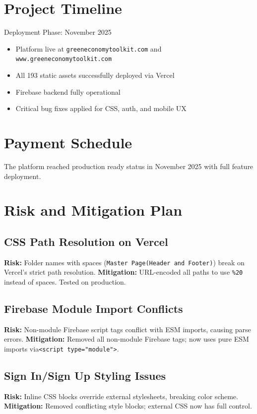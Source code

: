 \documentclass[a4paper,12pt]{article}
\begin{document}
\section{Project Timeline}
Deployment Phase: November 2025
\begin{itemize}
    \item Platform live at \texttt{greeneconomytoolkit.com} and \texttt{www.greeneconomytoolkit.com}
    \item All 193 static assets successfully deployed via Vercel
    \item Firebase backend fully operational
    \item Critical bug fixes applied for CSS, auth, and mobile UX
\end{itemize}

\section{Payment Schedule}
The platform reached production ready status in November 2025 with full feature deployment.

\section{Risk and Mitigation Plan}

\subsection{CSS Path Resolution on Vercel}
\textbf{Risk:} Folder names with spaces (\texttt{Master Page(Header and Footer)}) break on Vercel's strict path resolution.
\textbf{Mitigation:} URL-encoded all paths to use \texttt{\%20} instead of spaces. Tested on production.

\subsection{Firebase Module Import Conflicts}
\textbf{Risk:} Non-module Firebase script tags conflict with ESM imports, causing parse errors.
\textbf{Mitigation:} Removed all non-module Firebase tags; now uses pure ESM imports via\texttt{<script type="module">}.

\subsection{Sign In/Sign Up Styling Issues}
\textbf{Risk:} Inline CSS blocks override external stylesheets, breaking color scheme.
\textbf{Mitigation:} Removed conflicting style blocks; external CSS now has full control.
\end{document}
